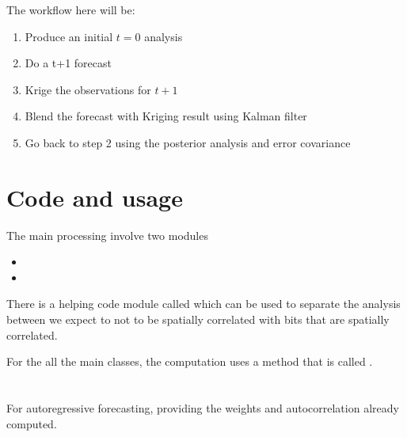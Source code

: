 \documentclass[letterpaper,10pt,english]{sphinxmanual}
\begin{document}
\sphinxAtStartPar
The workflow here will be:
\begin{enumerate}
%
\item {}
\sphinxAtStartPar
Produce an initial \(t=0\) analysis

\item {}
\sphinxAtStartPar
Do a t+1 forecast

\item {}
\sphinxAtStartPar
Krige the observations for \(t+1\)

\item {}
\sphinxAtStartPar
Blend the forecast with Kriging result using Kalman filter

\item {}
\sphinxAtStartPar
Go back to step 2 using the posterior analysis and error covariance

\end{enumerate}


\section{Code and usage}
\label{\detokenize{kalman:code-and-usage}}
\sphinxAtStartPar
The main processing involve two modules
\begin{itemize}
\item {}
\sphinxAtStartPar
{}

\item {}
\sphinxAtStartPar
{}

\end{itemize}

\sphinxAtStartPar
There is a helping code module called  which can be used to
separate the analysis between we expect to not to be spatially correlated with bits that are
spatially correlated.

\sphinxAtStartPar
For the all the main classes, the computation uses a method that is called .


\section{}
\label{\detokenize{kalman:autoregressive-kalman-forecast-linear-ar1}}
\sphinxAtStartPar
For autoregressive forecasting, providing the weights and autocorrelation already computed.
\end{document}
